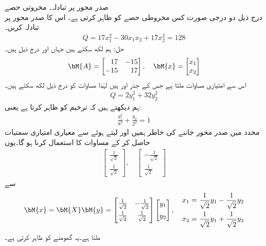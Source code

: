\quad صدر محور پر تبادلہ۔ مخروتی حصے\\
درج ذیل دو درجی صورت کس مخروطی حصے کو ظاہر کرتی ہے۔ اس کا صدر محور پر تبادلہ کریں۔
\begin{align*}
Q=17x_1^2-30x_1x_2+17x_2^2=128
\end{align*} 
حل: ہم  لکھ سکتے ہیں جہاں  اور  درج ذیل ہیں۔
\begin{align*}
\bM{A}=\begin{bmatrix*}[r]17&-15\\-15&17  \end{bmatrix*},\quad \bM{x}=\begin{bmatrix} x_1\\x_2 \end{bmatrix}
\end{align*}
اس سے امتیازی مساوات  ملتا ہے جس کے جذر  اور  ہیں لہٰذا مساوات  کو درج ذیل لکھ سکتے ہیں۔
\begin{align*}
Q=2y_1^2+32y_2^2
\end{align*}
ہم دیکھتے ہیں کہ   ترخیم  کو ظاہر کرتا ہے یعنی:
\begin{align*}
\frac{y_1^2}{8^2}+\frac{y_2}{2^2}=1
\end{align*}
 محدد میں صدر محور جاننے کی خاطر ہمیں  اور  لیتے ہوئے
  سے معیاری امتیازی سمتیات حاصل کر کے مساوات   کا استعمال کرنا ہو گا۔یوں
\begin{align*}
\begin{bmatrix}  \frac{1}{\sqrt{2}}\\[0.5em] \frac{1}{\sqrt{2}}\end{bmatrix}, \quad \begin{bmatrix}  -\frac{1}{\sqrt{2}}\\[0.5em] \frac{1}{\sqrt{2}}\end{bmatrix}
\end{align*}
سے
\begin{gather*}
\bM{x}=\bM{X}\bM{y}=\begin{bmatrix}\frac{1}{\sqrt{2}}&-\frac{1}{\sqrt{2}}\\[0.5em] \frac{1}{\sqrt{2}}&\frac{1}{\sqrt{2}} \end{bmatrix}\begin{bmatrix} y_1\\[0.5em]y_2 \end{bmatrix},\quad \begin{aligned}  x_1=\frac{1}{\sqrt{2}}y_1-\frac{1}{\sqrt{2}}y_2\\ x_2=\frac{1}{\sqrt{2}}y_1+\frac{1}{\sqrt{2}}y_2\end{aligned}
\end{gather*}
ملتا ہے۔یہ  گھومنے کو ظاہر کرتی ہے۔

